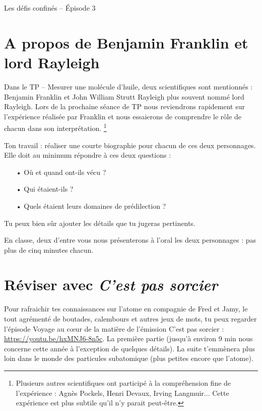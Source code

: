 \documentclass[12pt,a4paper]{article}
\begin{document}
\begin{header}
Les défis confinés -- Épisode 3
\end{header}

\section*{A propos de Benjamin Franklin et lord Rayleigh}

Dans le TP -- Mesurer une molécule d'huile, deux scientifiques sont mentionnés : Benjamin Franklin et John William Strutt Rayleigh plus souvent nommé lord Rayleigh.
Lors de la prochaine séance de TP nous reviendrons rapidement sur l'expérience réalisée par Franklin et nous essaierons de comprendre le rôle de chacun dans son interprétation.
\footnote{Plusieurs autres scientifiques ont participé à la compréhension fine de l'expérience : Agnès Pockels, Henri Devaux, Irving Langmuir...
Cette expérience est plus subtile qu'il n'y parait peut-être.}

Ton travail : réaliser une courte biographie pour chacun de ces deux personnages.
Elle doit au minimum répondre à ces deux questions :
\begin{itemize}
\item[•] Où et quand ont-ils vécu ?
\item[•] Qui étaient-ils ?
\item[•] Quels étaient leurs domaines de prédilection ?
\end{itemize}
Tu peux bien sûr ajouter les détails que tu jugeras pertinents.

En classe, deux d'entre vous nous présenterons à l'oral les deux personnages : pas plus de cinq minutes chacun.

\section*{Réviser avec \emph{C'est pas sorcier}}

Pour rafraichir tes connaissances sur l'atome en compagnie de Fred et Jamy, le tout agrémenté de boutades, calembours et autres jeux de mots, tu peux regarder l'épisode \og Voyage au cœur de la matière \fg{} de l'émission C'est pas sorcier : \href{https://youtu.be/hxMNJ6-8n5c}{https://youtu.be/hxMNJ6-8n5c}.
La première partie (jusqu'à environ 9 min nous concerne cette année à l'exception de quelques détails).
La suite t'emmènera plus loin dans le monde des particules subatomique (plus petites encore que l'atome).
\end{document}
